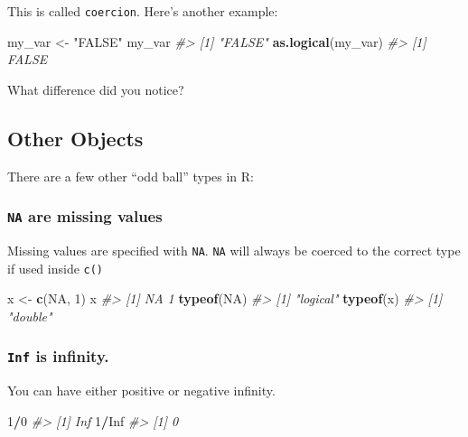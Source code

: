 \documentclass[]{book}
\newenvironment{Shaded}{\begin{snugshade}}{\end{snugshade}}
\newcommand{\KeywordTok}[1]{\textcolor[rgb]{0.13,0.29,0.53}{\textbf{#1}}}
\newcommand{\DecValTok}[1]{\textcolor[rgb]{0.00,0.00,0.81}{#1}}
\newcommand{\StringTok}[1]{\textcolor[rgb]{0.31,0.60,0.02}{#1}}
\newcommand{\CommentTok}[1]{\textcolor[rgb]{0.56,0.35,0.01}{\textit{#1}}}
\newcommand{\OtherTok}[1]{\textcolor[rgb]{0.56,0.35,0.01}{#1}}
\newcommand{\OperatorTok}[1]{\textcolor[rgb]{0.81,0.36,0.00}{\textbf{#1}}}
\newcommand{\NormalTok}[1]{#1}
\begin{document}
This is called \texttt{coercion}. Here's another example:

\begin{Shaded}
\begin{Highlighting}[]
\NormalTok{my_var <-}\StringTok{ "FALSE"}
\NormalTok{my_var}
\CommentTok{#> [1] "FALSE"}
\KeywordTok{as.logical}\NormalTok{(my_var)}
\CommentTok{#> [1] FALSE}
\end{Highlighting}
\end{Shaded}

What difference did you notice?

\subsection{Other Objects}\label{other-objects}

There are a few other ``odd ball'' types in R:

\subsubsection*{\texorpdfstring{\texttt{NA} are missing
values}{NA are missing values}}\label{na-are-missing-values}

Missing values are specified with \texttt{NA}. \texttt{NA} will always
be coerced to the correct type if used inside \texttt{c()}

\begin{Shaded}
\begin{Highlighting}[]
\NormalTok{x <-}\StringTok{ }\KeywordTok{c}\NormalTok{(}\OtherTok{NA}\NormalTok{, }\DecValTok{1}\NormalTok{)}
\NormalTok{x}
\CommentTok{#> [1] NA  1}
\KeywordTok{typeof}\NormalTok{(}\OtherTok{NA}\NormalTok{)}
\CommentTok{#> [1] "logical"}
\KeywordTok{typeof}\NormalTok{(x)}
\CommentTok{#> [1] "double"}
\end{Highlighting}
\end{Shaded}

\subsubsection*{\texorpdfstring{\texttt{Inf} is
infinity.}{Inf is infinity.}}\label{inf-is-infinity.}

You can have either positive or negative infinity.

\begin{Shaded}
\begin{Highlighting}[]
\DecValTok{1}\OperatorTok{/}\DecValTok{0}
\CommentTok{#> [1] Inf}
\DecValTok{1}\OperatorTok{/}\OtherTok{Inf}
\CommentTok{#> [1] 0}
\end{Highlighting}
\end{Shaded}
\end{document}
